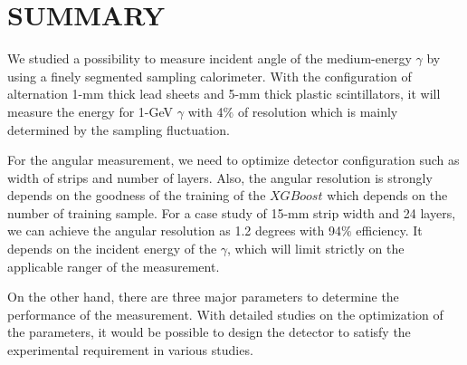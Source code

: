 \documentclass[jkps,preprint,fleqn,showpacs,showkeys]{revtex4}
\newcommand{\XGB}{XGBoost}
\begin{document}

\section{SUMMARY}
\label{sec:sum}
We studied a possibility to measure incident angle of the medium-energy $\gamma$ by using a finely segmented sampling calorimeter. With the configuration of alternation 1-mm thick lead sheets and 5-mm thick plastic scintillators, it will measure the energy for 1-GeV $\gamma$ with 4$\%$ of resolution which is mainly determined by the sampling fluctuation. 

For the angular measurement, we need to optimize detector configuration such as width of strips and number of layers. Also, the angular resolution is strongly depends on the goodness of the training of the $\XGB$ which depends on the number of training sample. For a case study of 15-mm strip width and 24 layers, we can achieve the angular resolution as 1.2 degrees with 94$\%$ efficiency. It depends on the incident energy of the $\gamma$, which will limit strictly on the applicable ranger of the measurement. 

On the other hand, there are three major parameters to determine the performance of the measurement. With detailed studies on the optimization of the parameters, it would be possible to design the detector to satisfy the experimental requirement in various studies. 




\label{sec:con}



\begin{acknowledgments}
\end{acknowledgments}


\end{document}
